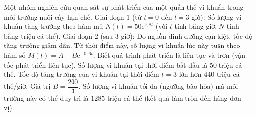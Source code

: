 \begin{ex}%
Một nhóm nghiên cứu quan sát sự phát triển của một quần thể vi khuẩn trong môi trường nuôi cấy hạn chế. Giai đoạn $1$ (từ $t=0$ đến $t=3$ giờ): Số lượng vi khuẩn tăng trưởng theo hàm mũ $N(t)=50\mathrm{e}^{0{,}8t}$ (với $t$ tính bằng giờ, $N$ tính bằng triệu cá thể). Giai đoạn $2$ (sau $3$ giờ): Do nguồn dinh dưỡng cạn kiệt, tốc độ tăng trưởng giảm dần. Từ thời điểm này, số lượng vi khuẩn lúc này tuân theo hàm số $M(t)=A-B\mathrm{e}^{-0{,}6t}$. Biết quá trình phát triển là liên tục và trơn (vận tốc phát triển liên tục).
\choiceTF
{\True Số lượng vi khuẩn tại thời điểm bắt đầu là $50$ triệu cá thể.}
{\True Tốc độ tăng trưởng của vi khuẩn tại thời điểm $t=3$ lớn hơn $440$ triệu cá thể/giờ.}
{Giá trị $B = \dfrac{200}{3}$.}
{Số lượng vi khuẩn tối đa (ngưỡng bão hòa) mà môi trường này có thể duy trì là $1285$ triệu cá thể (kết quả làm tròn đến hàng đơn vị).}
\end{ex}

